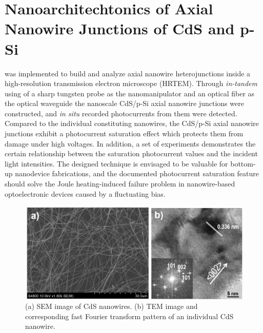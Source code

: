 

\chapter{Nanoarchitechtonics of Axial Nanowire Junctions of CdS and p-Si}

 was implemented to build and analyze axial nanowire heterojunctions inside a high-resolution transmission electron microscope (HRTEM). Through {\em in-tandem} using of a sharp tungsten probe as the nanomanipulator and an optical fiber as the optical waveguide the nanoscale CdS/p-Si axial nanowire junctions were constructed, and \textit{in situ} recorded photocurrents from them were detected. Compared to the individual constituting nanowires, the CdS/p-Si axial nanowire junctions exhibit a photocurrent saturation effect which protects them from damage under high voltages. In addition, a set of experiments demonstrates the certain relationship between the saturation photocurrent values and the incident light intensities. The designed technique is envisaged to be valuable for bottom-up nanodevice fabrications, and the documented photocurrent saturation feature should solve the Joule heating-induced failure problem in nanowire-based optoelectronic devices caused by a fluctuating bias. 

\begin{figure}  
\includegraphics[width=\textwidth]{figures/figure3_s1}
\caption[SEM and TEM of CdS nanowires.]{(a) SEM image of CdS nanowires. (b) TEM image and corresponding fast Fourier
transform pattern of an individual CdS nanowire. 
\label{fig:fig3_s1}}
\end{figure}

